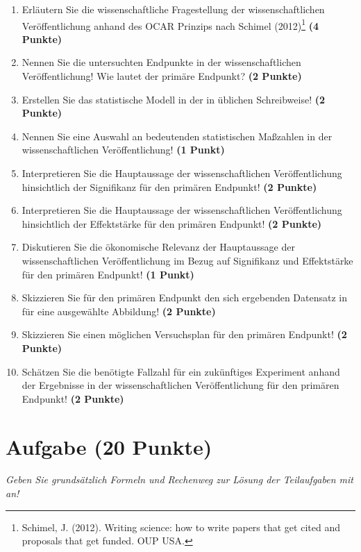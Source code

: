 \documentclass[a4paper, 9pt]{scrartcl}\usepackage[]{graphicx}\usepackage[]{xcolor}
\begin{document}
\begin{enumerate}
  \setcounter{enumi}{0}
  \item Erläutern Sie die wissenschaftliche Fragestellung der wissenschaftlichen Veröffentlichung anhand des OCAR Prinzips nach Schimel (2012)\footnote{Schimel, J. (2012). Writing science: how to write papers that get cited and proposals that get funded. OUP USA.} \textbf{(4 Punkte)}
  \item Nennen Sie die untersuchten Endpunkte in der wissenschaftlichen Veröffentlichung! Wie lautet der primäre Endpunkt? \textbf{(2 Punkte)} 
\item Erstellen Sie das statistische Modell in der in \Rlogo üblichen Schreibweise! \textbf{(2 Punkte)}
  \item Nennen Sie eine Auswahl an bedeutenden statistischen Maßzahlen in der wissenschaftlichen Veröffentlichung! \textbf{(1 Punkt)}
  \item Interpretieren Sie die Hauptaussage der wissenschaftlichen Veröffentlichung hinsichtlich der Signifikanz für den primären Endpunkt! \textbf{(2 Punkte)}
  \item Interpretieren Sie die Hauptaussage der wissenschaftlichen Veröffentlichung hinsichtlich der Effektstärke für den primären Endpunkt! \textbf{(2 Punkte)}
  \item Diskutieren Sie die ökonomische Relevanz der Hauptaussage der wissenschaftlichen Veröffentlichung im Bezug auf Signifikanz und Effektstärke für den primären Endpunkt! \textbf{(1 Punkt)}
  \item Skizzieren Sie für den primären Endpunkt den sich ergebenden Datensatz in \Rlogo für eine ausgewählte Abbildung! \textbf{(2 Punkte)}
\item Skizzieren Sie einen möglichen Versuchsplan für den primären Endpunkt! \textbf{(2 Punkte)}
  \item Schätzen Sie die benötigte Fallzahl für ein zukünftiges Experiment anhand der Ergebnisse in der wissenschaftlichen Veröffentlichung für den primären Endpunkt! \textbf{(2 Punkte)}
\end{enumerate} 
\clearpage

\section{Aufgabe \hfill (20 Punkte)}

\textit{Geben Sie grundsätzlich Formeln und Rechenweg zur Lösung der Teilaufgaben mit an!} \\[1Ex]
 
\end{document}
